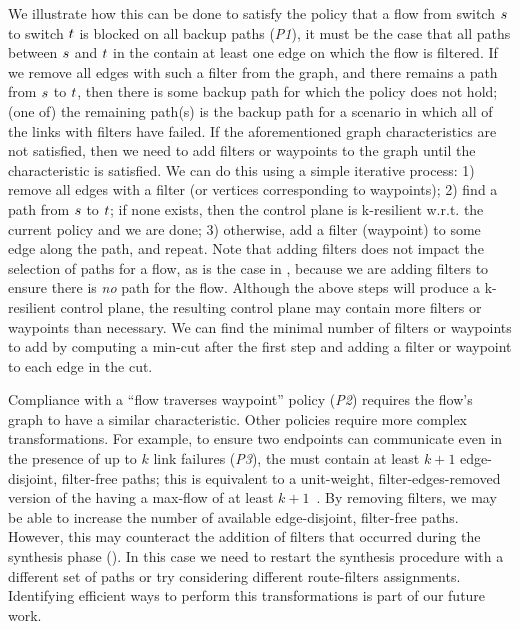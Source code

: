 We illustrate how this can be done
to satisfy the policy that a flow from switch $s$ to
switch $t$ is blocked on all backup paths ({\em P1}), it must be the
case that all paths between $s$ and $t$ in the \ARC contain
at least one edge on which the flow is filtered. If we remove all edges with
such a filter from the graph, and there remains a path from $s$ to
$t$, then there is some backup path for which the policy does not
hold; (one of) the remaining path(s) is the backup path for a scenario in
which all of the links with filters have failed. 
If the aforementioned graph characteristics are not satisfied, then we need to
add filters or waypoints to the graph until the characteristic is satisfied.
We can do this using a simple iterative process: 
1) remove all edges with a filter (or vertices corresponding to waypoints);
2) find a path from $s$ to $t$; if none exists,
    then the control plane is k-resilient w.r.t. the current policy and we are done;
 3) otherwise, add a filter (waypoint) to some edge along the path, and repeat.
Note that adding filters does not impact the selection of paths for a flow, as
is the case in , because we are adding filters to
ensure there is {\em no} path for the flow.
Although the above steps will produce a k-resilient control plane, the
resulting control plane may contain more filters or waypoints than necessary.
We can find the minimal number of filters or waypoints to add by computing a
min-cut after the first step and adding a filter or waypoint to each edge in the cut. 

Compliance with a ``flow
traverses waypoint'' policy ({\em P2}) requires the flow's graph to have a
similar characteristic.
Other policies require more complex transformations. For example, to ensure
two endpoints can communicate even in the presence of up to $k$ link failures
({\em P3}), the \ARC must contain at least $k+1$
edge-disjoint, filter-free paths; this is equivalent to a unit-weight,
filter-edges-removed version of the \ARC having a max-flow of at least
$k+1$~\cite{arc}. By removing filters, we may be able to increase the number
of available edge-disjoint, filter-free paths. However, this may counteract
the addition of filters that occurred during the \ARC synthesis phase
(). In this case we need to restart the synthesis procedure
with a different set of paths or try considering different route-filters assignments.
Identifying efficient ways to perform this transformations
is part of our future
work.
